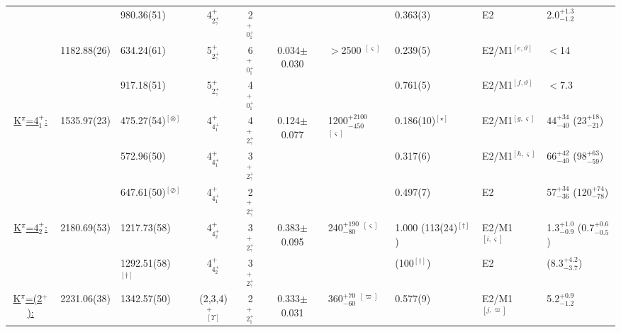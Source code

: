 \begin{landscape}
\begin{center}
\begin{longtable}{cllcccllll}
                                  &             &  980.36(51)               & 4$^+_{2^+_\gamma}$ & 2$^+_{0^+_1}$ &&                                                            & 0.363(3)            & E2                    & 2.0$^{+1.3}_{-1.2}$             \\ 
                                  & 1182.88(26) &  634.24(61)               & 5$^+_{2^+_\gamma}$ & 6$^+_{0^+_1}$ &0.034$\pm$0.030& $>$2500 $^{[\varsigma]}$                        &0.239(5)             & E2/M1$^{[e,\vartheta]}$  & $<$14   \\
                                  &             &  917.18(51)               & 5$^+_{2^+_\gamma}$ & 4$^+_{0^+_1}$ &&                                                            &0.761(5)             & E2/M1$^{[f,\vartheta]}$  & $<$7.3   \\ \hline
\underline{K$^\pi$=4$^+_1$:}      & 1535.97(23) &  475.27(54)$^{[\otimes]}$& 4$^+_{4^+_1}$& 4$^+_{2^+_\gamma}$ &0.124$\pm$0.077& 1200$^{+2100}_{-450}$ $^{[\varsigma]}$           &0.186(10)$^{[\star]}$& E2/M1$^{[g,\varsigma]}$    & 44$^{+34}_{-40}$ (23$^{+18}_{-21}$)       \\
                                  &             &  572.96(50)               & 4$^+_{4^+_1}$& 3$^+_{2^+_\gamma}$ &&                                                             &0.317(6)             & E2/M1$^{[h,\varsigma]}$    & 66$^{+42}_{-40}$ (98$^{+63}_{-59}$)       \\
                                  &             &  647.61(50)$^{[\oslash]}$ & 4$^+_{4^+_1}$& 2$^+_{2^+_\gamma}$ &&                                                             &0.497(7)             & E2                     & 57$^{+34}_{-36}$ (120$^{+74}_{-78}$)       \\ \hline
\underline{K$^\pi$=4$^+_2$:}      & 2180.69(53) &  1217.73(58)              & 4$^+_{4^+_2}$ & 3$^+_{2^+_\gamma}$ &0.383$\pm$0.095& 240$^{+190}_{-80}$ $^{[\varsigma]}$             &1.000  (113(24)$^{[\dagger]}$)              & E2/M1 $^{[i,\varsigma]}$      & 1.3$^{+1.0}_{-0.9}$  (0.7$^{+0.6}_{-0.5}$)      \\ 
                                  &             &  1292.51(58)$^{[\dagger]}$ & 4$^+_{4^+_2}$ & 3$^+_{2^+_\gamma}$ &&                                                              &(100$^{[\dagger]}$)                & E2                                 & (8.3$^{+4.2}_{-3.7}$)        \\ \hline
\underline{K$^\pi$=(2$^+$):}      & 2231.06(38) & 1342.57(50)               & (2,3,4)$^+_{[\Upsilon]}$& 2$^+_{2^+_1}$ &0.333$\pm$0.031& 360$^{+70}_{-60}$ $^{[\varpi]}$       &0.577(9)             & E2/M1$^{[j,\varpi]}$  & 5.2$^{+0.9}_{-1.2}$\\ \hline

\end{longtable}
\end{center}
\end{landscape}
